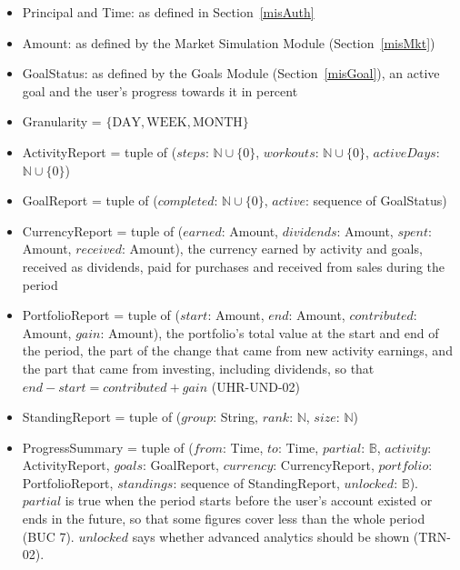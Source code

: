 \documentclass[12pt, titlepage]{article}
\begin{document}
\begin{itemize}
\item Principal and Time: as defined in Section~\ref{misAuth}
\item Amount: as defined by the Market Simulation Module
  (Section~\ref{misMkt})
\item GoalStatus: as defined by the Goals Module (Section~\ref{misGoal}), an
  active goal and the user's progress towards it in percent
\item Granularity = $\{\mathrm{DAY}, \mathrm{WEEK}, \mathrm{MONTH}\}$
\item ActivityReport = tuple of ($\mathit{steps}$: $\mathbb{N} \cup \{0\}$,
  $\mathit{workouts}$: $\mathbb{N} \cup \{0\}$, $\mathit{activeDays}$:
  $\mathbb{N} \cup \{0\}$)
\item GoalReport = tuple of ($\mathit{completed}$: $\mathbb{N} \cup \{0\}$,
  $\mathit{active}$: sequence of GoalStatus)
\item CurrencyReport = tuple of ($\mathit{earned}$: Amount,
  $\mathit{dividends}$: Amount, $\mathit{spent}$: Amount,
  $\mathit{received}$: Amount), the currency earned by activity and goals,
  received as dividends, paid for purchases and received from sales during
  the period
\item PortfolioReport = tuple of ($\mathit{start}$: Amount, $\mathit{end}$:
  Amount, $\mathit{contributed}$: Amount, $\mathit{gain}$: Amount), the
  portfolio's total value at the start and end of the period, the part of
  the change that came from new activity earnings, and the part that came
  from investing, including dividends, so that $\mathit{end} -
  \mathit{start} = \mathit{contributed} + \mathit{gain}$ (UHR-UND-02)
\item StandingReport = tuple of ($\mathit{group}$: String, $\mathit{rank}$:
  $\mathbb{N}$, $\mathit{size}$: $\mathbb{N}$)
\item ProgressSummary = tuple of ($\mathit{from}$: Time, $\mathit{to}$:
  Time, $\mathit{partial}$: $\mathbb{B}$, $\mathit{activity}$:
  ActivityReport, $\mathit{goals}$: GoalReport, $\mathit{currency}$:
  CurrencyReport, $\mathit{portfolio}$: PortfolioReport,
  $\mathit{standings}$: sequence of StandingReport, $\mathit{unlocked}$:
  $\mathbb{B}$). $\mathit{partial}$ is true when the period starts before
  the user's account existed or ends in the future, so that some figures
  cover less than the whole period (BUC 7). $\mathit{unlocked}$ says whether
  advanced analytics should be shown (TRN-02).
\end{itemize}
\end{document}
